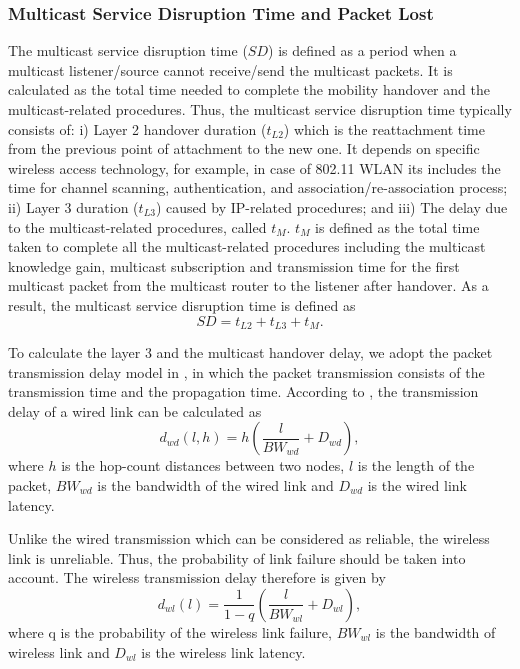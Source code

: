 \subsubsection{Multicast Service Disruption Time and Packet Lost}
The multicast service disruption time ($SD$) is defined as a period when a multicast listener/source cannot receive/send the multicast packets. It is calculated as the total time needed to complete the mobility handover and the multicast-related procedures. Thus, the multicast service disruption time typically consists of: i) Layer 2 handover duration ($t_{L2}$) which is the reattachment time from the previous point of attachment to the new one. It depends on specific wireless access technology, for example, in case of 802.11 WLAN its includes the time for channel scanning, authentication, and association/re-association process; ii) Layer 3 duration ($t_{L3}$) caused by IP-related procedures; and iii) The delay due to the multicast-related procedures, called $t_{M}$. $t_{M}$ is defined as the total time taken to complete all the multicast-related procedures including the multicast knowledge gain, multicast subscription and transmission time for the first multicast packet from the multicast router to the listener after handover. As a result, the multicast service disruption time is defined as 
\begin{equation}
SD = t_{L2} + t_{L3} + t_{M}.
\end{equation}

To calculate the layer 3 and the multicast handover delay, we adopt the packet transmission delay model in \cite{packet_transmission_delay}, in which the packet transmission consists of the transmission time and the propagation time.  
According to \cite{packet_transmission_delay}, the transmission delay of a wired link can be calculated as\\
\begin{equation}
d_{wd}(l,h) = h (\dfrac{l}{BW_{wd}} + D_{wd}),
\end{equation}
where $h$ is the hop-count distances between two nodes, $l$ is the length of the packet, $BW_{wd}$ is the bandwidth of the wired link and $D_{wd}$ is the wired link latency. 

Unlike the wired transmission which can be considered as reliable, the wireless link is unreliable. Thus, the probability of link failure should be taken into account. The wireless transmission delay therefore is given by \cite{packet_transmission_delay}\\
\begin{equation}
d_{wl}(l) = \dfrac{1}{1-q} (\dfrac{l}{BW_{wl}} + D_{wl}),
\end{equation} 
where q is the probability of the wireless link failure, $BW_{wl}$ is the bandwidth of wireless link and $D_{wl}$ is the wireless link latency.  

